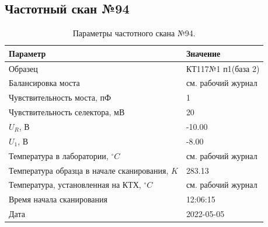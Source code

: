 \subsection{Частотный скан №94}
\begin{table}[!ht]
    \centering
    \caption{Параметры частотного скана №94.}
    \begin{tabular}{|l|l|}
        \hline
        Параметр                                       & Значение                  \\ \hline
        Образец                                        & КТ117№1 п1(база 2)        \\ \hline
        Балансировка моста                             & см. рабочий журнал        \\ \hline
        Чувствительность моста, пФ                     & 1                         \\ \hline
        Чувствительность селектора, мВ                 & 20                        \\ \hline
        $U_R$, В                                       & -10.00                    \\ \hline
        $U_1$, В                                       & -8.00                     \\ \hline
        Температура в лаборатории, $^\circ C$          & см. рабочий журнал        \\ \hline
        Температура образца в начале сканирования, $K$ & 283.13                    \\ \hline
        Температура, установленная на КТХ, $^\circ C$  & см. рабочий журнал        \\ \hline
        Время начала сканирования                      & 12:06:15                  \\ \hline
        Дата                                           & 2022-05-05                \\ \hline
    \end{tabular}
    \label{table:frequency_scan_94}
\end{table}

